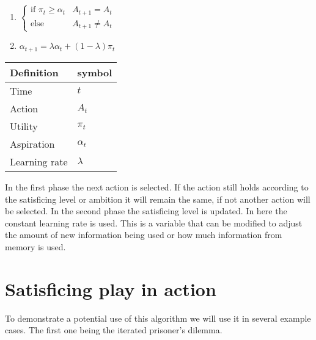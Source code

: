 \begin{enumerate}
  \item $ \begin{cases}
              \text{if } \pi_t \geq \alpha_t & A_{t+1} = A_t\\
              \text{else} & A_{t+1} \neq A_t
              \end{cases}$
  \item $ \alpha_{t+1} = \lambda \alpha_t + (1-\lambda) \pi_t $ \\
\end{enumerate}

\begin{tabular}{ll}
  Definition & symbol \\ \toprule
  Time & $t$ \\
  Action & $A_t$ \\
  Utility & $\pi_t$ \\
  Aspiration & $\alpha_t$ \\
  Learning rate & $\lambda$ \\ \bottomrule
\end{tabular}

In the first phase the next action is selected. If the action still holds
according to the satisficing level or ambition it will remain the same, if not another
action will be selected. In the second phase the satisficing level is updated.
In here the constant learning rate is used. This is a variable that can be
modified to adjust the amount of new information being used or how much
information from memory is used.


\section{Satisficing play in action}
\label{sec:playaction}
\cleared
To demonstrate a potential use of this algorithm we will use it in several
example cases. The first one being the iterated prisoner's dilemma.

